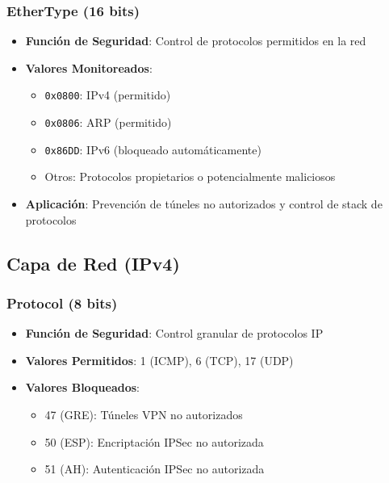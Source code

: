 \documentclass[12pt,a4paper]{article}
\begin{document}
\subsubsection{EtherType (16 bits)}
\begin{itemize}
    \item \textbf{Función de Seguridad}: Control de protocolos permitidos en la red
    \item \textbf{Valores Monitoreados}:
    \begin{itemize}
        \item \texttt{0x0800}: IPv4 (permitido)
        \item \texttt{0x0806}: ARP (permitido) 
        \item \texttt{0x86DD}: IPv6 (bloqueado automáticamente)
        \item Otros: Protocolos propietarios o potencialmente maliciosos
    \end{itemize}
    \item \textbf{Aplicación}: Prevención de túneles no autorizados y control de stack de protocolos
\end{itemize}

\subsection{Capa de Red (IPv4)}

\subsubsection{Protocol (8 bits)}
\begin{itemize}
    \item \textbf{Función de Seguridad}: Control granular de protocolos IP
    \item \textbf{Valores Permitidos}: 1 (ICMP), 6 (TCP), 17 (UDP)
    \item \textbf{Valores Bloqueados}: 
    \begin{itemize}
        \item 47 (GRE): Túneles VPN no autorizados
        \item 50 (ESP): Encriptación IPSec no autorizada
        \item 51 (AH): Autenticación IPSec no autorizada
    \end{itemize}
\end{itemize}
\end{document}
